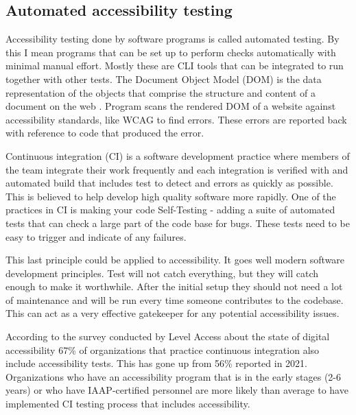\documentclass{master_thesis}
\begin{document}
\subsection{Automated accessibility testing}

Accessibility testing done by software programs is called automated testing. By this I mean programs that can be set up to perform checks automatically with minimal manual effort. Mostly these are CLI tools that can be integrated to run together with other tests. The Document Object Model (DOM) is the data representation of the objects that comprise the structure and content of a document on the web \citep{MDN2023}. Program scans the rendered DOM of a website against accessibility standards, like WCAG to find errors. These errors are reported back with reference to code that produced the error.

Continuous integration (CI) is a software development practice where members of the team integrate their work frequently and each integration is verified with and automated build that includes test to detect and errors as quickly as possible. This is believed to help develop high quality software more rapidly. One of the practices in CI is making your code Self-Testing - adding a suite of automated tests that can check a large part of the code base for bugs. These tests need to be easy to trigger and indicate of any failures.
\citep{Fowler2006}

This last principle could be applied to accessibility. It goes well modern software development principles. Test will not catch everything, but they will catch enough to make it worthwhile. After the initial setup they should not need a lot of maintenance and will be run every time someone contributes to the codebase. This can act as a very effective gatekeeper for any potential accessibility issues.

According to the survey conducted by Level Access about the state of digital accessibility 67\% of organizations that practice continuous integration also include accessibility tests. This has gone up from 56\% reported in 2021. Organizations who have an accessibility program that is in the early stages (2-6 years) or who have IAAP-certified personnel are more likely than average to have implemented CI testing process that includes accessibility. \citep{LevelAccess}
\end{document}
